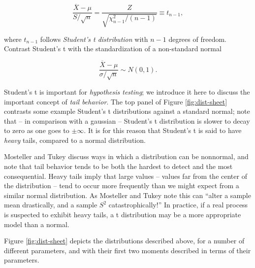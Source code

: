 \documentclass[../primer.tex]{subfiles}
\begin{document}
\begin{equation} \label{eq:t-def}
  \frac{\overline{X} - \mu}{S/\sqrt{n}} = \frac{Z}{\sqrt{\chi^2_{n-1}/(n-1)}} \equiv t_{n-1},
\end{equation}

\noindent where $t_{n-1}$ follows \emph{Student's t distribution} with $n-1$
degrees of freedom. Contrast Student's t with the standardization of a
non-standard normal

\begin{equation}
  \frac{\overline{X} - \mu}{\sigma/\sqrt{n}} \sim N(0, 1).
\end{equation}

Student's t is important for \emph{hypothesis testing}; we introduce it here to
discuss the important concept of \emph{tail behavior}. The top panel of Figure
\ref{fig:dist-sheet} contrasts some example Student's t distributions against a
standard normal; note that -- in comparison with a gaussian -- Student's t
distribution is slower to decay to zero as one goes to $\pm\infty$. It is for
this reason that Student's t is said to have \emph{heavy} tails, compared to a
normal distribution.

Mosteller and Tukey\cite{mosteller1977data} discuss ways in which a distribution
can be nonnormal, and note that tail behavior tends to be both the hardest to
detect and the most consequential. Heavy tails imply that large values -- values
far from the center of the distribution -- tend to occur more frequently than we
might expect from a similar normal distribution. As Mosteller and Tukey note
this can ``alter a sample mean drastically, and a sample $S^2$
catastrophically!'' In practice, if a real process is suspected to exhibit heavy
tails, a t distribution may be a more appropriate model than a normal.

Figure \ref{fig:dist-sheet} depicts the distributions described above, for a
number of different parameters, and with their first two moments described in
terms of their parameters.
\end{document}
